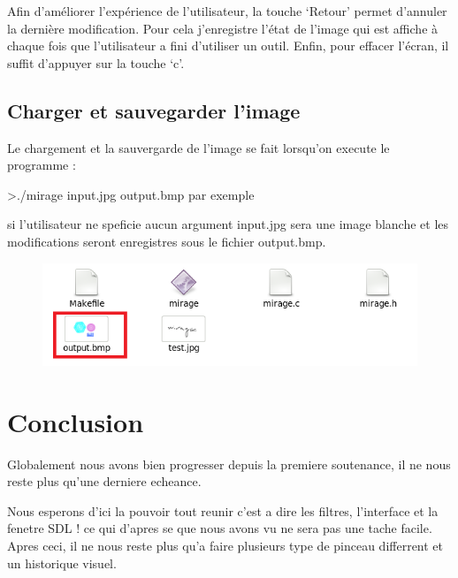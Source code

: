 \documentclass[12pt, a4paper]{report}
\begin{document}
Afin d’améliorer l’expérience de l’utilisateur, la touche ‘Retour’ permet d’annuler la dernière modification. Pour cela j’enregistre l’état de l’image qui est affiche à chaque fois que l’utilisateur a fini d’utiliser un outil. Enfin, pour effacer l’écran, il suffit d’appuyer sur la touche ‘c’.

\section {Charger et sauvegarder l’image}


Le chargement et la sauvergarde de l’image se fait lorsqu’on execute le programme :

>./mirage input.jpg output.bmp par exemple

si l’utilisateur ne speficie aucun argument input.jpg sera une image blanche et les modifications seront enregistres sous le fichier output.bmp.

\begin{figure}[!h]
\begin{center} \includegraphics[width=1\textwidth]{images/sauve.png} \end{center}
\end{figure}


\newpage






\chapter{Conclusion}
\par Globalement nous avons bien progresser depuis la premiere soutenance, il ne nous reste plus qu'une derniere echeance. \par Nous esperons d'ici la pouvoir tout reunir c'est a dire les filtres, l'interface et la fenetre SDL ! ce qui d'apres se que nous avons vu ne sera pas une tache facile. 
Apres ceci, il ne nous reste plus qu'a faire plusieurs type de pinceau differrent et un historique visuel.
\end{document}
